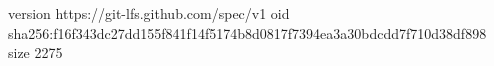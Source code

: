 version https://git-lfs.github.com/spec/v1
oid sha256:f16f343dc27dd155f841f14f5174b8d0817f7394ea3a30bdcdd7f710d38df898
size 2275
